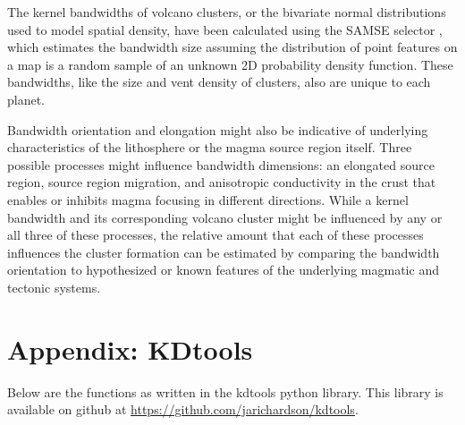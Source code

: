 The kernel bandwidths of volcano clusters, or the bivariate normal distributions used to model spatial density, have been calculated using the SAMSE selector \citep{duong2007}, which estimates the bandwidth size assuming the distribution of point features on a map is a random sample of an unknown 2D probability density function. These bandwidths, like the size and vent density of clusters, also are unique to each planet. 

Bandwidth orientation and elongation might also be indicative of underlying characteristics of the lithosphere or the magma source region itself. Three possible processes might influence bandwidth dimensions: an elongated source region, source region migration, and anisotropic conductivity in the crust that enables or inhibits magma focusing in different directions. While a kernel bandwidth and its corresponding volcano cluster might be influenced by any or all three of these processes, the relative amount that each of these processes influences the cluster formation can be estimated by comparing the bandwidth orientation to hypothesized or known features of the underlying magmatic and tectonic systems.


%
%


% 

\section{Appendix: KDtools}
\label{sec_kdtoolscode}
Below are the functions as written in the kdtools python library. This library is available on github at \url{https://github.com/jarichardson/kdtools}.

